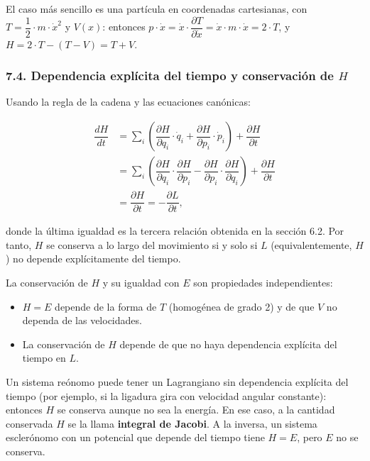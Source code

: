 \documentclass[
  spanish,
]{article}
\providecommand{\tightlist}{%
  \setlength{\itemsep}{0pt}\setlength{\parskip}{0pt}}
\begin{document}
El caso más sencillo es una partícula en coordenadas cartesianas, con
\(T = \dfrac{1}{2} \cdot m \cdot \dot{x}^2\) y \(V(x)\): entonces
\(p \cdot \dot{x} = \dot{x} \cdot \dfrac{\partial T}{\partial \dot{x}} = \dot{x} \cdot m \cdot \dot{x} = 2 \cdot T\),
y \(H = 2 \cdot T - (T - V) = T + V\).

\subsubsection{\texorpdfstring{7.4. Dependencia explícita del tiempo y
conservación de
\(H\)}{7.4. Dependencia explícita del tiempo y conservación de H}}\label{dependencia-expluxedcita-del-tiempo-y-conservaciuxf3n-de-h}

Usando la regla de la cadena y las ecuaciones canónicas:

\[
\begin{aligned}
\dfrac{dH}{dt}
&= \sum_{i} \left( \dfrac{\partial H}{\partial q_i} \cdot \dot{q}_i + \dfrac{\partial H}{\partial p_i} \cdot \dot{p}_i \right) + \dfrac{\partial H}{\partial t} \\
&= \sum_{i} \left( \dfrac{\partial H}{\partial q_i} \cdot \dfrac{\partial H}{\partial p_i} - \dfrac{\partial H}{\partial p_i} \cdot \dfrac{\partial H}{\partial q_i} \right) + \dfrac{\partial H}{\partial t} \\
&= \dfrac{\partial H}{\partial t} = -\dfrac{\partial L}{\partial t},
\end{aligned}
\]

donde la última igualdad es la tercera relación obtenida en la sección
6.2. Por tanto, \(H\) se conserva a lo largo del movimiento si y solo si
\(L\) (equivalentemente, \(H\)) no depende explícitamente del tiempo.

La conservación de \(H\) y su igualdad con \(E\) son propiedades
independientes:

\begin{itemize}
\tightlist
\item
  \(H = E\) depende de la forma de \(T\) (homogénea de grado 2) y de que
  \(V\) no dependa de las velocidades.
\item
  La conservación de \(H\) depende de que no haya dependencia explícita
  del tiempo en \(L\).
\end{itemize}

Un sistema reónomo puede tener un Lagrangiano sin dependencia explícita
del tiempo (por ejemplo, si la ligadura gira con velocidad angular
constante): entonces \(H\) se conserva aunque no sea la energía. En ese
caso, a la cantidad conservada \(H\) se la llama \textbf{integral de
Jacobi}. A la inversa, un sistema esclerónomo con un potencial que
depende del tiempo tiene \(H = E\), pero \(E\) no se conserva.
\end{document}
